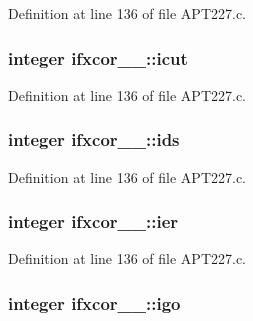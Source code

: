 Definition at line 136 of file A\+P\+T227.\+c.

\subsubsection[{\texorpdfstring{icut}{icut}}]{\setlength{\rightskip}{0pt plus 5cm}integer ifxcor\+\_\+\_\+\+::icut}\hypertarget{structifxcor__1___aaccc47cde934a5eea1f2f589d1915ca1}{}\label{structifxcor__1___aaccc47cde934a5eea1f2f589d1915ca1}


Definition at line 136 of file A\+P\+T227.\+c.

\subsubsection[{\texorpdfstring{ids}{ids}}]{\setlength{\rightskip}{0pt plus 5cm}integer ifxcor\+\_\+\_\+\+::ids}\hypertarget{structifxcor__1___a29924efc49d86bd8a881d6b27c8878e0}{}\label{structifxcor__1___a29924efc49d86bd8a881d6b27c8878e0}


Definition at line 136 of file A\+P\+T227.\+c.

\subsubsection[{\texorpdfstring{ier}{ier}}]{\setlength{\rightskip}{0pt plus 5cm}integer ifxcor\+\_\+\_\+\+::ier}\hypertarget{structifxcor__1___af93198bfd48971c8c1402770f58f97c0}{}\label{structifxcor__1___af93198bfd48971c8c1402770f58f97c0}


Definition at line 136 of file A\+P\+T227.\+c.

\subsubsection[{\texorpdfstring{igo}{igo}}]{\setlength{\rightskip}{0pt plus 5cm}integer ifxcor\+\_\+\_\+\+::igo}\hypertarget{structifxcor__1___aa1442bdb23b8ab2005f16ef22f23be88}{}\label{structifxcor__1___aa1442bdb23b8ab2005f16ef22f23be88}


